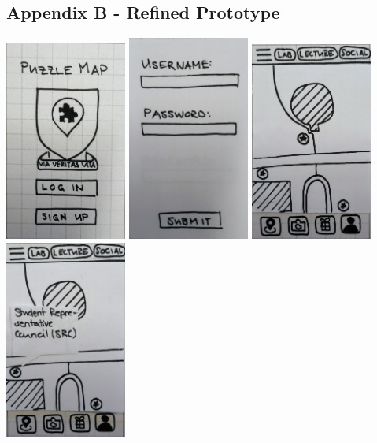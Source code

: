 \documentclass[10pt,twocolumn]{article} %
\begin{document}
\newpage
\newpage
\subsection*{Appendix B - Refined Prototype}\vspace*{25px}
\includegraphics[width=0.3\textwidth]{./figures/refined_proto/1.jpg}\hfill
\includegraphics[width=0.3\textwidth]{./figures/refined_proto/1b.jpg}\hfill
\includegraphics[width=0.3\textwidth]{./figures/refined_proto/2.jpg}\hfill
\vspace*{25px}
\includegraphics[width=0.3\textwidth]{./figures/refined_proto/3.jpg}\hfill
\end{document}
